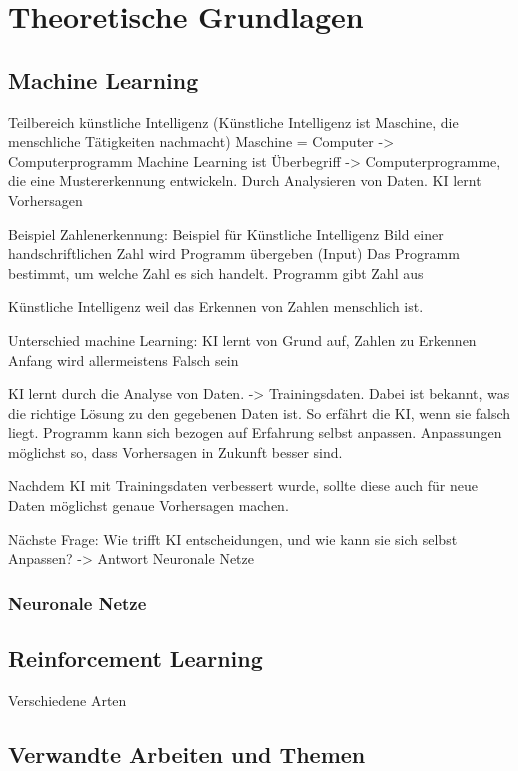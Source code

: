 \chapter{Theoretische Grundlagen}

\section{Machine Learning}
\label{chap:t_ml}
Teilbereich künstliche Intelligenz (Künstliche Intelligenz ist Maschine, die menschliche Tätigkeiten nachmacht) Maschine = Computer -> Computerprogramm
Machine Learning ist Überbegriff -> Computerprogramme, die eine Mustererkennung entwickeln. Durch Analysieren von Daten. KI lernt Vorhersagen

Beispiel Zahlenerkennung:
Beispiel für Künstliche Intelligenz
Bild einer handschriftlichen Zahl wird Programm übergeben (Input)
Das Programm bestimmt, um welche Zahl es sich handelt.
Programm gibt Zahl aus

Künstliche Intelligenz weil das Erkennen von Zahlen menschlich ist.

Unterschied machine Learning: KI lernt von Grund auf, Zahlen zu Erkennen
Anfang wird allermeistens Falsch sein

KI lernt durch die Analyse von Daten. -> Trainingsdaten. Dabei ist bekannt, was die richtige Lösung zu den gegebenen Daten ist.
So erfährt die KI, wenn sie falsch liegt. 
Programm kann sich bezogen auf Erfahrung selbst anpassen. Anpassungen möglichst so, dass Vorhersagen in Zukunft besser sind.

Nachdem KI mit Trainingsdaten verbessert wurde, sollte diese auch für neue Daten möglichst genaue Vorhersagen machen.

Nächste Frage: Wie trifft KI entscheidungen, und wie kann sie sich selbst Anpassen? -> Antwort Neuronale Netze


\subsection*{Neuronale Netze}




\section{Reinforcement Learning}
\label{chap:t_rl}
Verschiedene Arten


\section{Verwandte Arbeiten und Themen}
\label{chap:t_verwandt}

